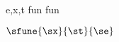 \documentclass{article}
\begin{document}
{e,x,t}
{}
{fun}
{fun}

\(\sfune{\sx}{\st}{\se}\)
\end{document}
